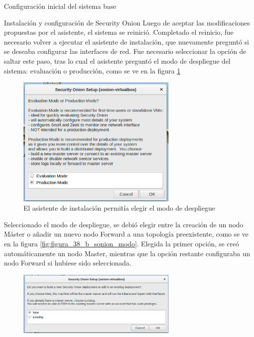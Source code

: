 \begin{section}{Configuración inicial del sistema base}
\begin{subsection}{Instalación y configuración de Security Onion}
        Luego de aceptar las modificaciones propuestas por el asistente, el sistema se reinició. Completado el reinicio, fue necesario volver a ejecutar el asistente de instalación, que nuevamente preguntó si se deseaba configurar las interfaces de red. Fue necesario seleccionar la opción de saltar este paso, tras lo cual el asistente preguntó el modo de despliegue del sistema: evaluación o producción, como se ve en la figura \ref{fig:figura_38_sonion_modo}
        \begin{figure}[H]
            \centering
            \includegraphics[width=0.7\textwidth]{./iteracion_1_imagenes/figura_38_sonion_modo.png}
            \caption{El asistente de instalación permitía elegir el modo de despliegue}
            \label{fig:figura_38_sonion_modo}
        \end{figure}
        \FloatBarrier
        Seleccionado el modo de despliegue, se debió elegir entre la creación de un nodo Máster o añadir un nuevo nodo Forward a una topología preexistente, como se ve en la figura \ref{fig:figura_38_b_sonion_modo}. Elegida la primer opción, se creó automáticamente un nodo Master, mientras que la opción restante configuraba un nodo Forward si hubiese sido seleccionada. \par
        \begin{figure}[H]
            \centering
            \includegraphics[width=0.7\textwidth]{./iteracion_1_imagenes/figura_38_b_sonion_modo.png}

\end{figure}
\end{subsection}
\end{section}
